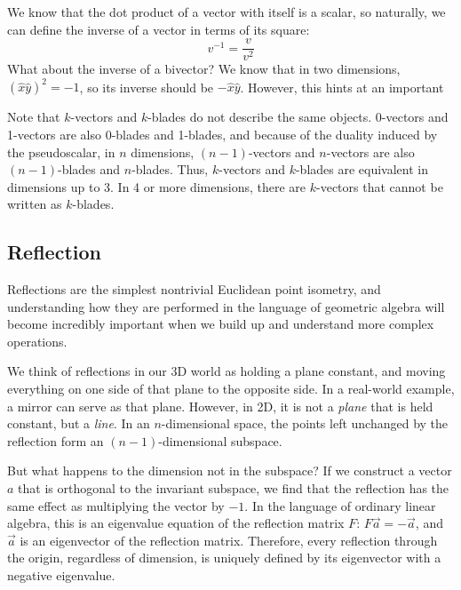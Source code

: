 We know that the dot product of a vector with itself is a scalar, so naturally, we can define the
inverse of a vector in terms of its square:
\begin{equation}
v^{-1} = \frac{v}{v^2}
\end{equation}
What about the inverse of a bivector? We know that in two dimensions,
$\left(\hat{x}\hat{y}\right)^2 = -1$, so its inverse should be $-\hat{x}\hat{y}$. However, this
hints at an important 

Note that $k$-vectors and $k$-blades do not describe the same objects. 0-vectors and 1-vectors are
also 0-blades and 1-blades, and because of the duality induced by the pseudoscalar, in $n$
dimensions, $\left(n-1\right)$-vectors and $n$-vectors are also $\left(n-1\right)$-blades and
$n$-blades. Thus, $k$-vectors and $k$-blades are equivalent in dimensions up to 3. In 4 or more
dimensions, there are $k$-vectors that cannot be written as $k$-blades.

\subsection{Reflection}

Reflections are the simplest nontrivial Euclidean point isometry, and understanding how they are
performed in the language of geometric algebra will become incredibly important when we build up
and understand more complex operations.

We think of reflections in our 3D world as holding a plane constant, and moving everything on one
side of that plane to the opposite side. In a real-world example, a mirror can serve as that plane.
However, in 2D, it is not a \textit{plane} that is held constant, but a \textit{line}. In an
$n$-dimensional space, the points left unchanged by the reflection form an
$\left(n-1\right)$-dimensional subspace.

But what happens to the dimension not in the subspace? If we construct a vector $a$ that is
orthogonal to the invariant subspace, we find that the reflection has the same effect as multiplying
the vector by $-1$. In the language of ordinary linear algebra, this is an eigenvalue equation of
the reflection matrix $F$: $F\vec{a} = -\vec{a}$, and $\vec{a}$ is an eigenvector of the reflection
matrix. Therefore, every reflection through the origin, regardless of dimension, is uniquely defined
by its eigenvector with a negative eigenvalue.


